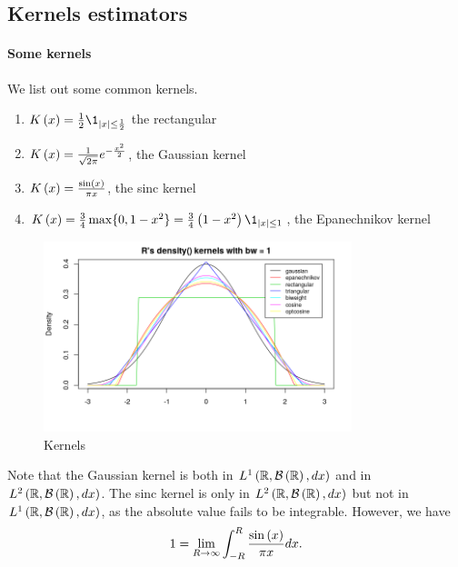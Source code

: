 
\subsection{Kernels estimators}
\paragraph{Some kernels} We list out some common kernels.
\begin{enumerate}
  \item \label{ker:rect} $K\pa{x}=\frac{1}{2}\1_{\abs{x}\le \frac{1}{2}}$ the rectangular
  \item\label{ker:gauss} $K\left(x\right) = \frac{1}{\sqrt{2\pi}} e^{-\frac{x^2}{2}}$, the Gaussian kernel
  \item\label{ker:sinc} $K\left(x\right) = \frac{\sin\left(x\right)}{\pi x}$, the sinc kernel
  \item \label{ker:epan} $K\pa{x} = \frac{3}{4}\max\{0,1-x^2\}=\frac{3}{4}\pa{1-x^2}\1_{\abs{x}\le 1}$, the Epanechnikov kernel
\end{enumerate}
\begin{figure}[!h]
  \centering
  \includegraphics[width=0.8\textwidth]{figures/kernels.png}
  \caption{Kernels}
\end{figure}
\begin{remark}
  Note that the Gaussian kernel is both in $L^1\left(\mathbb{R},\mathcal{B}\left(\mathbb{R}\right),dx\right)$ and in $L^2\left(\mathbb{R},\mathcal{B}\left(\mathbb{R}\right),dx\right)$. The sinc kernel is only in $L^2\left(\mathbb{R},\mathcal{B}\left(\mathbb{R}\right),dx\right)$ but not in $L^1\left(\mathbb{R},\mathcal{B}\left(\mathbb{R}\right),dx\right)$, as the absolute value fails to be integrable. However, we have
  \begin{equation*}
    1 = \lim_{R\rightarrow \infty}\int_{-R}^R \frac{\sin\left(x\right)}{\pi x} dx.
  \end{equation*}
\end{remark}
